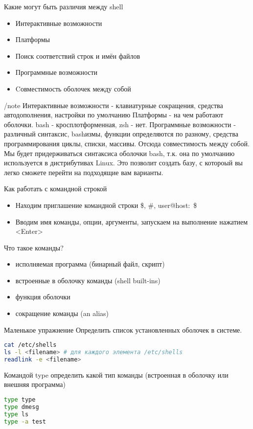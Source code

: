 \begin{frame}[fragile]{Какие могут быть различия между shell}
  \begin{itemize}
    \item Интерактивные возможности
    \item Платформы
    \item Поиск соответствий строк и имён файлов
    \item Программные возможности
    \item Cовместимость оболочек между собой
\end{itemize}
\end{frame}
/note {
Интерактивные возможности - клавиатурные сокращения, средства автодополнения, настройки по умолчанию
Платформы - на чем работают оболочки. bash - кросплотформенная, zsh - нет. 
Программные возможности - различный синтаксис, bashизмы, функции определяются
по разному, средства программирования циклы, списки, массивы. Отсюда
совместимость между собой. 
Мы будет придерживаться синтаксиса оболочки bash, т.к. она по умолчанию
используется в дистрибутивах Linux.  Это позволит создать базу, с
котороый вы легко сможете перейти на подходящие вам варианты. 
}


\begin{frame}[fragile]{Как работать с командной строкой}
  \begin{itemize}
    \item 
	Находим приглашение командной строки
	\$, \#, user@host:~\$
    \item
	Вводим имя команды, опции, аргументы, запускаем на выполнение нажатием <Enter>
   \end{itemize}

	Что такое команды?
  \begin{itemize}
    \item исполняемая программа (бинарный файл, скрипт)
    \item встроенные в оболочку команды (shell built-ins)
    \item функция оболочки
    \item сокращение команды (an alias) 
  \end{itemize}
\end{frame}


\begin{frame}[fragile]{Маленькое упражнение}
Определить список установленных оболочек в системе.
\begin{lstlisting}[language=bash]
cat /etc/shells
ls -l <filename> # для каждого элемента /etc/shells
readlink -e <filename> 
\end{lstlisting}
Командой type определить какой тип команды (встроенная в оболочку или внешняя программа)
\begin{lstlisting}[language=bash]
type type
type dmesg
type ls
type -a test
\end{lstlisting}
\end{frame}


